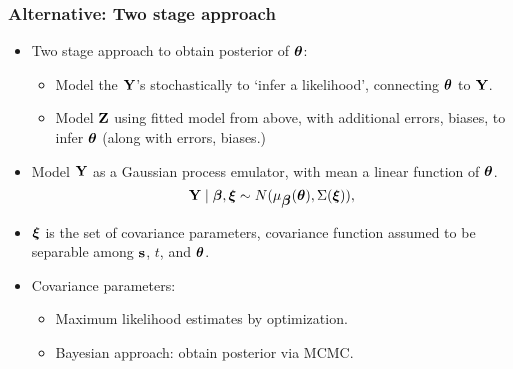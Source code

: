 \documentclass{beamer}
\begin{document}
\begin{frame}
  \frametitle{Alternative: Two stage approach}
    \begin{itemize}
    \item Two stage approach to obtain posterior of $\mbox{\boldmath $\theta$}$:
\begin{itemize}
\item Model the ${\bf Y}$'s stochastically to `infer a likelihood', connecting $\mbox{\boldmath $\theta$}$ to ${\bf Y}$.
\item Model ${\bf Z}$ using fitted model from above, with additional
   errors, biases, to infer $\mbox{\boldmath $\theta$}$ (along with errors, biases.)
\end{itemize}
    \item Model ${\bf Y}$ as a Gaussian process emulator, with mean a linear function of $\mbox{\boldmath $\theta$}$. 
     $${\bf Y} \mid \mbox{\boldmath $\beta$}, \mbox{\boldmath $\xi$} \sim N(\mu_{\mbox{\boldmath $\beta$}}(\mbox{\boldmath $\theta$}),\Sigma(\mbox{\boldmath $\xi$})),$$
  \item $\mbox{\boldmath $\xi$}$ is the set of covariance parameters, covariance function assumed to be separable among ${\bf s}$, $t$, and $\mbox{\boldmath $\theta$}$.
  \item Covariance parameters:
       \begin{itemize}
     	\item Maximum likelihood estimates by optimization.
     	\item Bayesian approach: obtain posterior via MCMC.
     \end{itemize}
    
          \end{itemize}
\end{frame}
\end{document}
